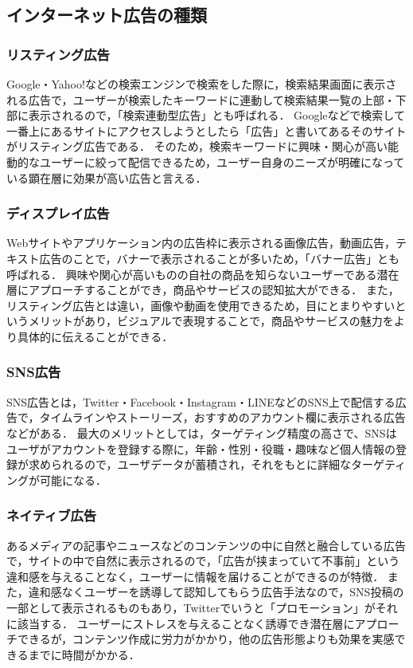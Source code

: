 \documentclass[12pt,a4j,titlepage]{ltjsarticle}
\begin{document}
\subsection{インターネット広告の種類}
\subsubsection{リスティング広告}
\label{subsubsec:rs}
Google・Yahoo!などの検索エンジンで検索をした際に，検索結果画面に表示される広告で，ユーザーが検索したキーワードに連動して検索結果一覧の上部・下部に表示されるので，「検索連動型広告」とも呼ばれる．
Googleなどで検索して一番上にあるサイトにアクセスしようとしたら「広告」と書いてあるそのサイトがリスティング広告である．
そのため，検索キーワードに興味・関心が高い能動的なユーザーに絞って配信できるため，ユーザー自身のニーズが明確になっている顕在層に効果が高い広告と言える．

\subsubsection{ディスプレイ広告}
Webサイトやアプリケーション内の広告枠に表示される画像広告，動画広告，テキスト広告のことで，バナーで表示されることが多いため，「バナー広告」とも呼ばれる．
興味や関心が高いものの自社の商品を知らないユーザーである潜在層にアプローチすることができ，商品やサービスの認知拡大ができる．
また，リスティング広告とは違い，画像や動画を使用できるため，目にとまりやすいというメリットがあり，ビジュアルで表現することで，商品やサービスの魅力をより具体的に伝えることができる．

\subsubsection{SNS広告}
SNS広告とは，Twitter・Facebook・Instagram・LINEなどのSNS上で配信する広告で，タイムラインやストーリーズ，おすすめのアカウント欄に表示される広告などがある．
最大のメリットとしては，ターゲティング精度の高さで、SNSはユーザがアカウントを登録する際に，年齢・性別・役職・趣味など個人情報の登録が求められるので，ユーザデータが蓄積され，それをもとに詳細なターゲティングが可能になる．

\subsubsection{ネイティブ広告}
あるメディアの記事やニュースなどのコンテンツの中に自然と融合している広告で，サイトの中で自然に表示されるので，「広告が挟まっていて不事前」という違和感を与えることなく，ユーザーに情報を届けることができるのが特徴．
また，違和感なくユーザーを誘導して認知してもらう広告手法なので，SNS投稿の一部として表示されるものもあり，Twitterでいうと「プロモーション」がそれに該当する．
ユーザーにストレスを与えることなく誘導でき潜在層にアプローチできるが，コンテンツ作成に労力がかかり，他の広告形態よりも効果を実感できるまでに時間がかかる．
\end{document}
